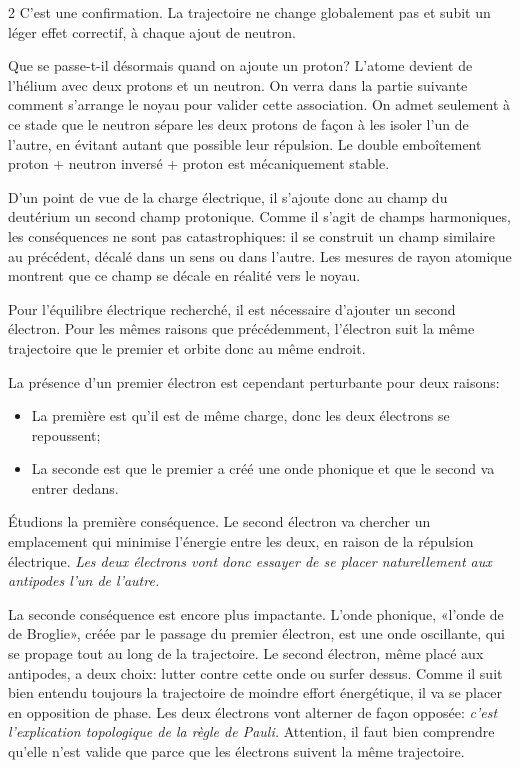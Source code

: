 \begin{multicols}{2}
C'est une confirmation. La trajectoire ne change globalement pas et
subit un léger effet correctif, à chaque ajout de neutron.
\medskip

Que se passe-t-il désormais quand on ajoute un proton? L'atome
devient de l'hélium avec deux protons et un neutron. On verra dans la
partie suivante comment s'arrange le noyau pour valider cette
association. On admet seulement à ce stade que le neutron sépare les
deux protons de façon à les isoler l'un de l'autre, en évitant autant
que possible leur répulsion. Le double emboîtement proton + neutron
inversé + proton est mécaniquement stable.

D'un point de vue de la charge électrique, il s'ajoute donc au champ du
deutérium un second champ protonique. Comme il s'agit de champs
harmoniques, les conséquences ne sont pas catastrophiques: il se
construit un champ similaire au précédent, décalé dans un sens ou dans
l'autre. Les mesures de rayon atomique montrent que ce champ se décale en
réalité vers le noyau.

Pour l'équilibre électrique recherché, il est nécessaire d'ajouter un
second électron. Pour les mêmes raisons que précédemment, l'électron suit la
même trajectoire que le premier et orbite donc au même endroit. 

La
présence d'un premier électron est cependant perturbante pour deux raisons:

\begin{itemize}
	\item La première est qu'il est de même charge, donc les deux électrons se repoussent;
	\item La seconde est que le premier a créé une onde phonique et que le
	second va entrer dedans.
\end{itemize}

Étudions la première conséquence. Le second électron va chercher un
emplacement qui minimise l'énergie entre les deux, en raison de la
répulsion électrique.\textit{ Les deux électrons vont donc essayer de se
placer naturellement aux antipodes l'un de l'autre.}

La seconde conséquence est encore plus impactante. L'onde phonique,
«l'onde de de Broglie», créée par le passage du premier électron,
est une onde oscillante, qui se propage tout au long de la
trajectoire. Le second électron, même placé aux antipodes, a deux
choix: lutter contre cette onde ou surfer dessus. Comme il suit bien
entendu toujours la trajectoire de moindre effort énergétique, il va
se placer en opposition de phase. Les deux électrons vont alterner de
façon opposée: \textit{c'est l'explication topologique de la règle de Pauli.}
Attention, il faut bien comprendre qu'elle n'est valide que parce que
les électrons suivent la même trajectoire.


\end{multicols}
